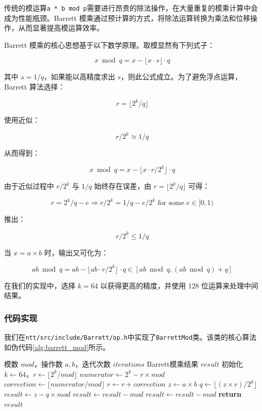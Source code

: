 \documentclass[a4paper]{article}
\begin{document}
传统的模运算\texttt{a * b mod p}需要进行昂贵的除法操作，在大量重复的模乘计算中会成为性能瓶颈。Barrett 模乘通过预计算的方式，将除法运算转换为乘法和位移操作，从而显著提高模运算效率。

Barrett 模乘的核心思想基于以下数学原理。取模显然有下列式子：

\[x \bmod q = x - \lfloor x \cdot s \rfloor \cdot q\]

其中 $s = 1/q$，如果能以高精度求出 $s$，则此公式成立。为了避免浮点运算，Barrett 算法选择：

\[r = \lfloor 2^k / q \rfloor\]

使用近似：

\[r / 2^k \approx 1/q\]

从而得到：

\[x \bmod q = x - \lfloor x \cdot r / 2^k \rfloor \cdot q\]

由于近似过程中 $r / 2^k$ 与 $1/q$ 始终存在误差，由 $r = \lfloor 2^k / q \rfloor$ 可得：

\[r = 2^k / q - e \Rightarrow r / 2^k = 1 / q - e / 2^k \text{ for some } e \in [0, 1)\]

推出：

\[r / 2^k \leq 1 / q\]

当 $x = a \times b$ 时，输出又可化为：

\[ab \bmod q = ab - \lfloor ab \cdot r / 2^k \rfloor \cdot q \in [ab \bmod q, (ab \bmod q) + q]\]

在我们的实现中，选择 $k = 64$ 以获得更高的精度，并使用 128 位运算来处理中间结果。

\subsubsection{代码实现}

我们在\texttt{ntt/src/include/Barrett/op.h}中实现了\texttt{BarrettMod}类。该类的核心算法如伪代码\ref{alg:barrett_mod}所示。

\begin{algorithm}[htbp]
\caption{Barrett模乘算法实现}
\label{alg:barrett_mod}
\begin{algorithmic}[1]
\Require 模数 $mod$，操作数 $a, b$，迭代次数 $iterations$
\Ensure Barrett模乘结果 $result$
\State 初始化 $k \gets 64$，$r \gets \lfloor 2^k / mod \rfloor$
    \State $numerator \gets 2^k - r \times mod$
    \State $correction \gets \lfloor numerator / mod \rfloor$
    \State $r \gets r + correction$
\EndFor
\State $z \gets a \times b$
\State $q \gets \lfloor (z \times r) / 2^k \rfloor$
\State $result \gets z - q \times mod$
    \State $result \gets result - mod$
\EndIf
{}
    \State $result \gets result - mod$
\EndIf
\State \textbf{return} $result$
\end{algorithmic}
\end{algorithm}
\end{document}
